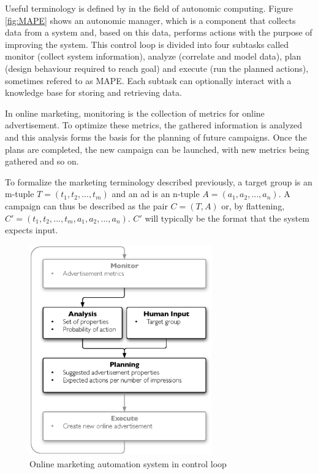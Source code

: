 \documentclass[a4paper]{article}
\begin{document}
Useful terminology is defined by \citet{IBM2006} in the field of autonomic computing. Figure \ref{fig:MAPE} shows an autonomic manager, which is a component that collects data from a system and, based on this data, performs actions with the purpose of improving the system. This control loop is divided into four subtasks called monitor (collect system information), analyze (correlate and model data), plan (design behaviour required to reach goal) and execute (run the planned actions), sometimes refered to as MAPE. Each subtask can optionally interact with a knowledge base for storing and retrieving data.

In online marketing, monitoring is the collection of metrics for online advertisement. To optimize these metrics, the gathered information is analyzed and this analysis forms the basis for the planning of future campaigns. Once the plans are completed, the new campaign can be launched, with new metrics being gathered and so on.

To formalize the marketing terminology described previously, a target group is an m-tuple \(T = (t_1, t_2, ..., t_m)\) and an ad is an n-tuple \(A = (a_1, a_2, ..., a_n)\). A campaign can thus be described as the pair \(C = (T, A)\) or, by flattening, \(C' = (t_1, t_2, ..., t_m, a_1, a_2, ..., a_n)\). \(C'\) will typically be the format that the system expects input.

\begin{figure}[h!] \centering \includegraphics[width=0.7\textwidth]{mape-marketing.eps}
	\caption{Online marketing automation system in control loop}
	\label{fig:MAPEMarketing}
\end{figure}
\end{document}
